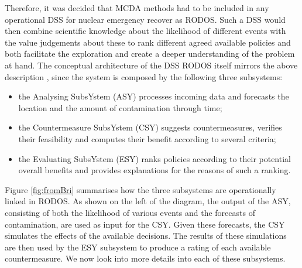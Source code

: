 Therefore, it was decided that MCDA methods had to be included in any operational DSS for nuclear emergency recover as RODOS. Such a DSS would then combine scientific knowledge about the likelihood of different events with the value judgements about these  to rank different agreed available policies and both facilitate the exploration and create a deeper understanding of the problem at hand. The conceptual architecture of the DSS RODOS itself mirrors the above description \citep{Caminada2000}, since the system is composed by the following three subsystems:
\begin{itemize}
\item the Analysing SubsYstem (ASY) processes incoming data and forecasts the location and the amount of contamination through time;
\item the  Countermeasure SubsYstem (CSY) suggests countermeasures, verifies their feasibility and computes their benefit according to several criteria;
\item the Evaluating SubsYstem (ESY) ranks policies according to their potential overall benefits and provides explanations  for the reasons of such a ranking.   
\end{itemize} 
Figure \ref{fig:fromBri} summarises how the three subsystems are operationally linked in RODOS. As shown on the left of the diagram, the output of the ASY, consisting of both the likelihood of various events and the forecasts of contamination, are used as input for the CSY. Given these forecasts, the CSY simulates the effects of the available decisions. The results of these simulations are then used by the ESY subsystem to produce a rating of each available countermeasure. We now look into more details into each of these subsystems.

